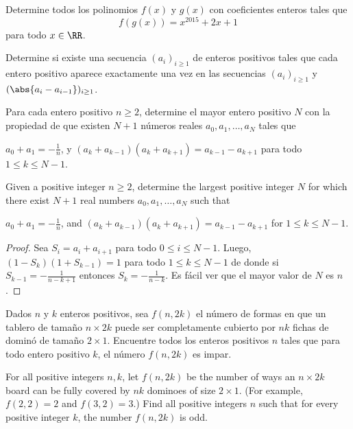 \note[Miscelánea]{}

\begin{probEG}
	Determine todos los polinomios $f(x)$ y $g(x)$ con coeficientes enteros tales que
	\[f(g(x))=x^{2015}+2x+1\]
	para todo $x\in\RR$.
\end{probEG}

\begin{probEG}
	Determine si existe una secuencia $(a_i)_{i\ge 1}$ de enteros positivos tales que cada entero positivo aparece exactamente una vez en las secuencias $(a_i)_{i\ge 1}$ y $(\abs{a_i-a_{i-1}})_{i\ge 1}$.
\end{probEG}


\begin{probEG}[EGMO 2022/4]
	Para cada entero positivo $n\ge 2$, determine el mayor entero positivo $N$ con la propiedad de que existen $N+1$ números reales $a_0,a_1,\dots,a_N$ tales que
	\begin{enumerate}[(1)]
		\ii $a_0+a_1=-\frac1n$, y
		\ii $(a_k+a_{k-1})(a_k+a_{k+1})=a_{k-1}-a_{k+1}$ para todo $1\le k\le N-1$.
	\end{enumerate}
	\begin{hint}
		Given a positive integer $n\ge 2$, determine the largest positive integer $N$ for which there exist $N+1$ real numbers $a_0,a_1,\dots,a_N$ such that
		\begin{enumerate}[(1)]
			\ii $a_0+a_1=-\frac1n$, and
			\ii $(a_k+a_{k-1})(a_k+a_{k+1})=a_{k-1}-a_{k+1}$ for $1\le k\le N-1$.
		\end{enumerate}
	\end{hint}
\end{probEG}

\begin{proof}
	Sea $S_i=a_i+a_{i+1}$ para todo $0\le i\le N-1$. Luego, $(1-S_k)(1+S_{k-1})=1$ para todo $1\le k\le N-1$ de donde si $S_{k-1}=-\frac{1}{n-k+1}$ entonces $S_k=-\frac{1}{n-k}$. Es fácil ver que el mayor valor de $N$ es $n$.
\end{proof}

\begin{probEG}[EGMO 2022/5]
	Dados $n$ y $k$ enteros positivos, sea $f(n,2k)$ el número de formas en que un tablero de tamaño $n\times 2k$ puede ser completamente cubierto por $nk$ fichas de dominó de tamaño $2\times 1$. Encuentre todos los enteros positivos $n$ tales que para todo entero positivo $k$, el número $f(n,2k)$ es impar.
	\begin{hint}
		For all positive integers $n,k$, let $f(n,2k)$ be the number of ways an $n\times 2k$ board can be fully covered by $nk$ dominoes of size $2\times 1$. (For example, $f(2,2)=2$ and $f(3,2)=3$.) Find all positive integers $n$ such that for every positive integer $k$, the number $f(n,2k)$ is odd.
	\end{hint}
\end{probEG}

